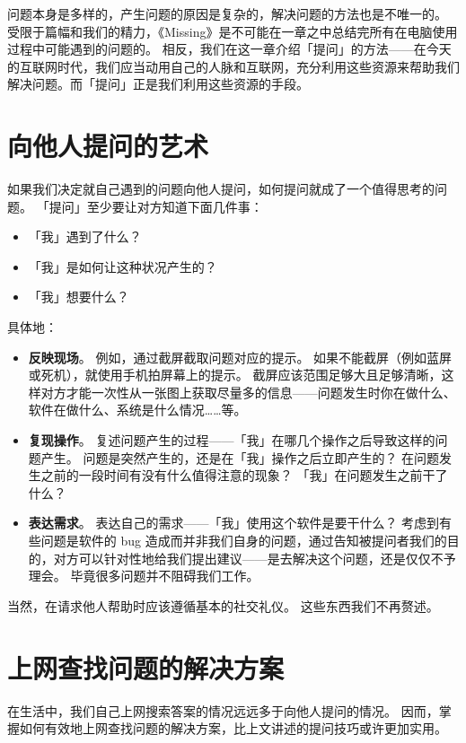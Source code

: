 问题本身是多样的，产生问题的原因是复杂的，解决问题的方法也是不唯一的。
受限于篇幅和我们的精力，《Missing》是不可能在一章之中总结完所有在电脑使用过程中可能遇到的问题的。
相反，我们在这一章介绍「提问」的方法——在今天的互联网时代，我们应当动用自己的人脉和互联网，充分利用这些资源来帮助我们解决问题。而「提问」正是我们利用这些资源的手段。

\section{向他人提问的艺术}

如果我们决定就自己遇到的问题向他人提问，如何提问就成了一个值得思考的问题。
「提问」至少要让对方知道下面几件事：

\begin{itemize}
  \item 「我」遇到了什么？
  \item 「我」是如何让这种状况产生的？
  \item 「我」想要什么？
\end{itemize}

具体地：

\begin{itemize}
  \item \textbf{反映现场}。
    例如，通过截屏截取问题对应的提示。
    如果不能截屏（例如蓝屏或死机），就使用手机拍屏幕上的提示。
    截屏应该范围足够大且足够清晰，这样对方才能一次性从一张图上获取尽量多的信息——问题发生时你在做什么、软件在做什么、系统是什么情况……等。
  \item \textbf{复现操作}。
    复述问题产生的过程——「我」在哪几个操作之后导致这样的问题产生。
    问题是突然产生的，还是在「我」操作之后立即产生的？
    在问题发生之前的一段时间有没有什么值得注意的现象？
    「我」在问题发生之前干了什么？
  \item \textbf{表达需求}。
    表达自己的需求——「我」使用这个软件是要干什么？
    考虑到有些问题是软件的 bug 造成而并非我们自身的问题，通过告知被提问者我们的目的，对方可以针对性地给我们提出建议——是去解决这个问题，还是仅仅不予理会。
    毕竟很多问题并不阻碍我们工作。
\end{itemize}

当然，在请求他人帮助时应该遵循基本的社交礼仪。
这些东西我们不再赘述。

\section{上网查找问题的解决方案}

在生活中，我们自己上网搜索答案的情况远远多于向他人提问的情况。
因而，掌握如何有效地上网查找问题的解决方案，比上文讲述的提问技巧或许更加实用。

